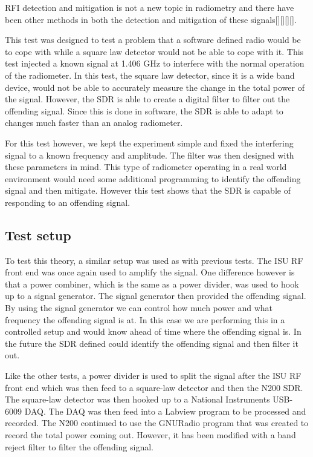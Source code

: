 RFI detection and mitigation is not a new topic in radiometry and there have been other methods in both the detection and mitigation of these signals[\cite{Forte}][\cite{McIntyre_RFI}][\cite{DeRoo}][\cite{Ellingson}].

This test was designed to test a problem that a software defined radio would be to cope with while a square law detector would not be able to cope with it.  This test injected a known signal at 1.406 GHz to interfere with the normal operation of the radiometer.  In this test, the square law detector, since it is a wide band device, would not be able to accurately measure the change in the total power of the signal.  However, the SDR is able to create a digital filter to filter out the offending signal.  Since this is done in software, the SDR is able to adapt to changes much faster than an analog radiometer.

For this test however, we kept the experiment simple and fixed the interfering signal to a known frequency and amplitude.  The filter was then designed with these parameters in mind.  This type of radiometer operating in a real world environment would need some additional programming to identify the offending signal and then mitigate.  However this test shows that the SDR is capable of responding to an offending signal.

\subsection{Test setup}
To test this theory, a similar setup was used as with previous tests.  The ISU RF front end was once again used to amplify the signal.  One difference however is that a power combiner, which is the same as a power divider, was used to hook up to a signal generator.  The signal generator then provided the offending signal.  By using the signal generator we can control how much power and what frequency the offending signal is at.  In this case we are performing this in a controlled setup and would know ahead of time where the offending signal is.  In the future the SDR defined could identify the offending signal and then filter it out.

Like the other tests, a power divider is used to split the signal after the ISU RF front end which was then feed to a square-law detector and then the N200 SDR.  The square-law detector was then hooked up to a National Instruments USB-6009 DAQ.  The DAQ was then feed into a Labview program to be processed and recorded.  The N200 continued to use the GNURadio program that was created to record the total power coming out.  However, it has been modified with a band reject filter to filter the offending signal.

